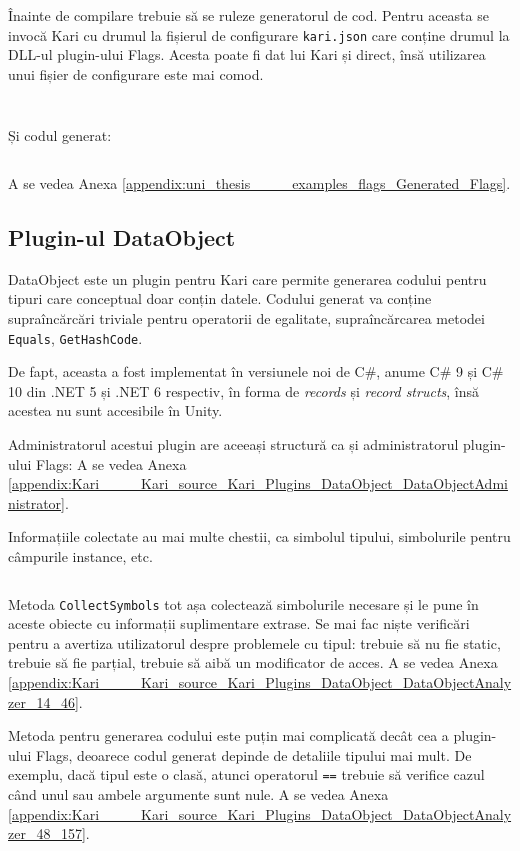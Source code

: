 \documentclass[a4paper,12pt]{report}
\begin{document}
Înainte de compilare trebuie să se ruleze generatorul de cod.
Pentru aceasta se invocă Kari cu drumul la fișierul de configurare \texttt{kari.json} care conține drumul la \ac{DLL}-ul plugin-ului Flags.
Acesta poate fi dat lui Kari și direct, însă utilizarea unui fișier de configurare este mai comod.
\inputminted{bat}{../examples/flags/kari.bat}
\inputminted{js}{../examples/flags/kari.json}


Și codul generat:
\inputminted{cs}{../examples/flags/Generated/FlagsAnnotations.cs}
A se vedea Anexa \ref{appendix:uni_thesis____examples_flags_Generated_Flags}.

\subsection{Plugin-ul DataObject}

DataObject este un plugin pentru Kari care permite generarea codului pentru tipuri care conceptual doar conțin datele.
Codului generat va conține supraîncărcări triviale pentru operatorii de egalitate, supraîncărcarea metodei \texttt{Equals}, \texttt{GetHashCode}.

De fapt, aceasta a fost implementat în versiunele noi de C\#, anume C\# 9 și C\# 10 din {{.}NET} 5 și {{.}NET} 6 respectiv, în forma de \emph{records} și \emph{record structs}, însă acestea nu sunt accesibile în Unity.\cite{records_in_csharp}

Administratorul acestui plugin are aceeași structură ca și administratorul plugin-ului Flags:
A se vedea Anexa \ref{appendix:Kari____Kari_source_Kari_Plugins_DataObject_DataObjectAdministrator}.

Informațiile colectate au mai multe chestii, ca simbolul tipului, simbolurile pentru câmpurile instance, etc.
\inputminted[firstline=160, lastline=180]{cs}{../Kari/source/Kari.Plugins/DataObject/DataObjectAnalyzer.cs}

Metoda \texttt{CollectSymbols} tot așa colectează simbolurile necesare și le pune în aceste obiecte cu informații suplimentare extrase.
Se mai fac niște verificări pentru a avertiza utilizatorul despre problemele cu tipul: trebuie să nu fie static, trebuie să fie parțial, trebuie să aibă un modificator de acces.
A se vedea Anexa \ref{appendix:Kari____Kari_source_Kari_Plugins_DataObject_DataObjectAnalyzer_14_46}.

Metoda pentru generarea codului este puțin mai complicată decât cea a plugin-ului Flags, deoarece codul generat depinde de detaliile tipului mai mult.
De exemplu, dacă tipul este o clasă, atunci operatorul \texttt{==} trebuie să verifice cazul când unul sau ambele argumente sunt nule.
A se vedea Anexa \ref{appendix:Kari____Kari_source_Kari_Plugins_DataObject_DataObjectAnalyzer_48_157}.
\end{document}
